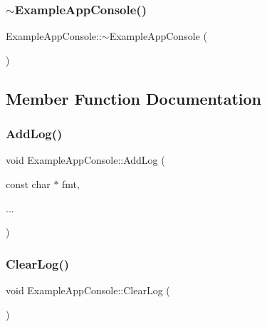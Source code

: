 \subsubsection{\texorpdfstring{$\sim$\+Example\+App\+Console()}{~ExampleAppConsole()}}
{\footnotesize\ttfamily Example\+App\+Console\+::$\sim$\+Example\+App\+Console (\begin{DoxyParamCaption}{ }\end{DoxyParamCaption})}



\subsection{Member Function Documentation}
\hypertarget{struct_example_app_console_a719354ce6be7481923a5fd702e785952}{}\label{struct_example_app_console_a719354ce6be7481923a5fd702e785952} 
\subsubsection{\texorpdfstring{Add\+Log()}{AddLog()}}
{\footnotesize\ttfamily void Example\+App\+Console\+::\+Add\+Log (\begin{DoxyParamCaption}\item[{const char $\ast$}]{fmt,  }\item[{}]{... }\end{DoxyParamCaption})}

\hypertarget{struct_example_app_console_a2ef13f00c474b16b8da2ec062d5e5cc2}{}\label{struct_example_app_console_a2ef13f00c474b16b8da2ec062d5e5cc2} 
\subsubsection{\texorpdfstring{Clear\+Log()}{ClearLog()}}
{\footnotesize\ttfamily void Example\+App\+Console\+::\+Clear\+Log (\begin{DoxyParamCaption}{ }\end{DoxyParamCaption})}

\hypertarget{struct_example_app_console_a0518a09c7e8648dd52c7c06df19ac17a}{}\label{struct_example_app_console_a0518a09c7e8648dd52c7c06df19ac17a} 
